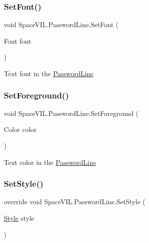 \subsubsection{\texorpdfstring{Set\+Font()}{SetFont()}}
{\footnotesize\ttfamily void Space\+V\+I\+L.\+Password\+Line.\+Set\+Font (\begin{DoxyParamCaption}\item[{Font}]{font }\end{DoxyParamCaption})}



Text font in the \mbox{\hyperlink{class_space_v_i_l_1_1_password_line}{Password\+Line}} 

\mbox{\label{class_space_v_i_l_1_1_password_line_a9ca1d5dc8f4f3f3036f8a8098930b350}} 
\subsubsection{\texorpdfstring{Set\+Foreground()}{SetForeground()}}
{\footnotesize\ttfamily void Space\+V\+I\+L.\+Password\+Line.\+Set\+Foreground (\begin{DoxyParamCaption}\item[{Color}]{color }\end{DoxyParamCaption})}



Text color in the \mbox{\hyperlink{class_space_v_i_l_1_1_password_line}{Password\+Line}} 

\mbox{\label{class_space_v_i_l_1_1_password_line_a96f208561afd0f7e997c79fe85aa4d6d}} 
\subsubsection{\texorpdfstring{Set\+Style()}{SetStyle()}}
{\footnotesize\ttfamily override void Space\+V\+I\+L.\+Password\+Line.\+Set\+Style (\begin{DoxyParamCaption}\item[{\mbox{\hyperlink{class_space_v_i_l_1_1_decorations_1_1_style}{Style}}}]{style }\end{DoxyParamCaption})\hspace{0.3cm}{\ttfamily [virtual]}}



